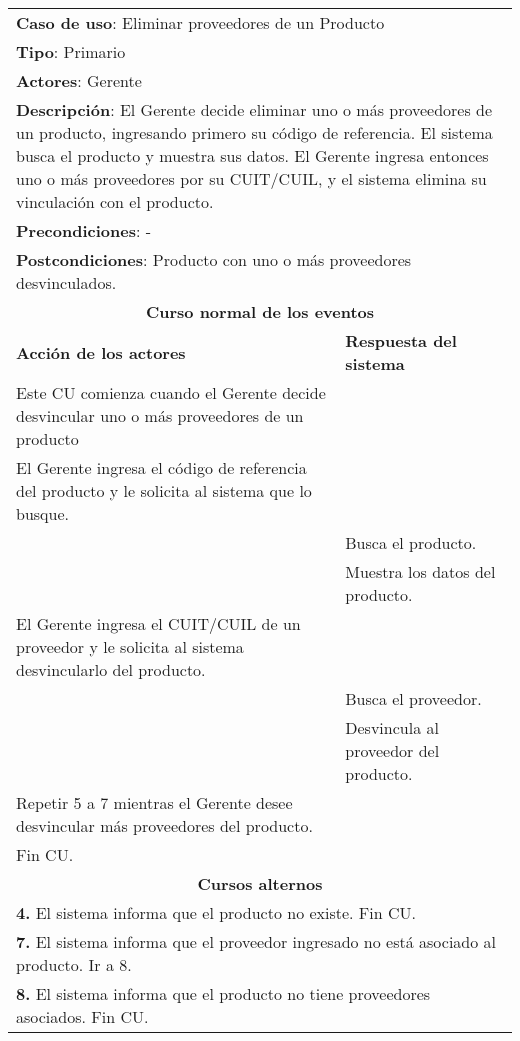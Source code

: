 \begin{longtable}{ |p{8cm}|p{8cm}| }
		\hline
		\multicolumn{2}{|p{16cm}|}{\textbf{Caso de uso}: Eliminar proveedores de un Producto }\\
		\multicolumn{2}{|p{16cm}|}{\textbf{Tipo}: Primario }\\
		\multicolumn{2}{|p{16cm}|}{\textbf{Actores}: Gerente }\\
		\multicolumn{2}{|p{16cm}|}{\textbf{Descripción}: El Gerente decide eliminar uno o más proveedores de un producto, ingresando primero su código de referencia. El sistema busca el producto y muestra sus datos. El Gerente ingresa entonces uno o más proveedores por su CUIT/CUIL, y el sistema elimina su vinculación con el producto. }\\
		\multicolumn{2}{|p{16cm}|}{\textbf{Precondiciones}: -}\\
		\multicolumn{2}{|p{16cm}|}{\textbf{Postcondiciones}: Producto con uno o más proveedores desvinculados. }\\
		\hline
		\multicolumn{2}{|c|}{\textbf{Curso normal de los eventos}}\\
		\hline
		\textbf{Acción de los actores} & \textbf{Respuesta del sistema}\\
		\hline
			\inc Este CU comienza cuando el Gerente decide desvincular uno o más proveedores de un producto & \\
			\hline
			\inc El Gerente ingresa el código de referencia del producto y le solicita al sistema que lo busque.& \\
			\hline
			& \inc Busca el producto. \\
			\hline
			& \inc Muestra los datos del producto. \\
			\hline
			\inc El Gerente ingresa el CUIT/CUIL de un proveedor y le solicita al sistema desvincularlo del producto. & \\
			\hline
			& \inc Busca el proveedor. \\
			\hline
			& \inc Desvincula al proveedor del producto. \\
			\hline
			\inc Repetir 5 a 7 mientras el Gerente desee desvincular más proveedores del producto. & \\
			\hline
			\inc Fin CU. & \\
		\hline
		\multicolumn{2}{|c|}{\textbf{Cursos alternos}}\\
		\hline
		\multicolumn{2}{|p{16cm}|}{\textbf{4. }El sistema informa que el producto no existe. Fin CU.}\\
		\hline
		\multicolumn{2}{|p{16cm}|}{\textbf{7. }El sistema informa que el proveedor ingresado no está asociado al producto. Ir a 8.}\\
		\hline
		\multicolumn{2}{|p{16cm}|}{\textbf{8. }El sistema informa que el producto no tiene proveedores asociados. Fin CU.}\\
	\end{longtable}
